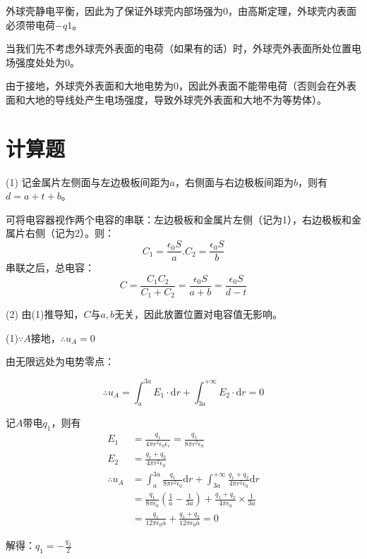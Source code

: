 \documentclass[b5paper,opensource,sourcefont,parskip]{qyxf-book}
\newcommand{\di}[1]{\mathrm{d}#1}
\begin{document}
\solve 外球壳静电平衡，因此为了保证外球壳内部场强为0，由高斯定理，外球壳内表面必须带电荷$ -q1 $。

当我们先不考虑外球壳外表面的电荷（如果有的话）时，外球壳外表面所处位置电场强度处处为0。

由于接地，外球壳外表面和大地电势为0，因此外表面不能带电荷（否则会在外表面和大地的导线处产生电场强度，导致外球壳外表面和大地不为等势体）。

\section{计算题}


\solve (1) 记金属片左侧面与左边极板间距为$ a $，右侧面与右边极板间距为$ b $，则有$ d=a+t+b $。

可将电容器视作两个电容的串联：左边极板和金属片左侧（记为1），右边极板和金属片右侧（记为2）。则：
\[C_1=\frac{\epsilon_0 S}{a}.C_2=\frac{\epsilon_0 S}{b}\]
串联之后，总电容：
\[C=\frac{C_1C_2}{C_1+C_2}=\frac{\epsilon_0 S}{a+b}=\frac{\epsilon_0 S}{d-t}\]

(2) 由(1)推导知，$ C $与$ a,b $无关，因此放置位置对电容值无影响。


\solve (1)$ \because A$接地，$ \therefore u_A=0 $

由无限远处为电势零点：

\begin{equation}
\therefore u_A=\int_a^{3a} E_1\cdot\di{r} +\int_{3a}^{+\infty} E_2\cdot\di{r} =0
\end{equation}

记$ A $带电$ q_1 $，则有
\begin{equation}
\begin{aligned}
E_1&=\frac{q_1}{4\pi r^2\epsilon_0\epsilon_r}=\frac{q_1}{8\pi r^2\epsilon_0}\\
E_2&=\frac{q_1+q_2}{4\pi r^2\epsilon_0}\\
\therefore u_A&=\int_a^{3a}\frac{q_1}{8\pi r^2\epsilon_0}\di{r}+\int_{3a}^{+\infty}\frac{q_1+q_2}{4\pi r^2\epsilon_0}\di{r}\\
&=\frac{q_1}{8\pi\epsilon_0}\left(\frac{1}{a}-\frac{1}{3a}\right)+\frac{q_1+q_2}{4\pi\epsilon_0}\times \frac{1}{3a}\\
&=\frac{q_1}{12\pi\epsilon_0a}+\frac{q_1+q_2}{12\pi\epsilon_0a}=0
\end{aligned}
\end{equation}

解得：$ q_1=-\frac{q_2}{2} $
\end{document}
